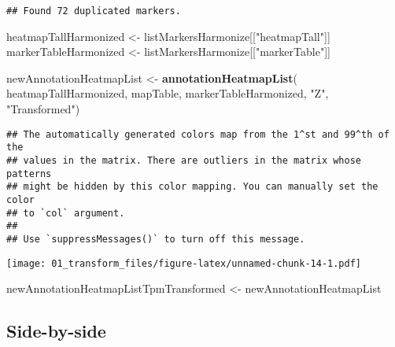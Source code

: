 \documentclass[
]{article}
\newenvironment{Shaded}{\begin{snugshade}}{\end{snugshade}}
\newcommand{\FunctionTok}[1]{\textcolor[rgb]{0.13,0.29,0.53}{\textbf{#1}}}
\newcommand{\NormalTok}[1]{#1}
\newcommand{\OtherTok}[1]{\textcolor[rgb]{0.56,0.35,0.01}{#1}}
\newcommand{\SpecialCharTok}[1]{\textcolor[rgb]{0.81,0.36,0.00}{\textbf{#1}}}
\newcommand{\StringTok}[1]{\textcolor[rgb]{0.31,0.60,0.02}{#1}}
\begin{document}
\begin{verbatim}
## Found 72 duplicated markers.
\end{verbatim}

\begin{Shaded}
\begin{Highlighting}[]
\NormalTok{heatmapTallHarmonized }\OtherTok{\textless{}{-}}\NormalTok{ listMarkersHarmonize[[}\StringTok{"heatmapTall"}\NormalTok{]]}
\NormalTok{markerTableHarmonized }\OtherTok{\textless{}{-}}\NormalTok{ listMarkersHarmonize[[}\StringTok{"markerTable"}\NormalTok{]]}
\end{Highlighting}
\end{Shaded}

\begin{Shaded}
\begin{Highlighting}[]
\NormalTok{newAnnotationHeatmapList }\OtherTok{\textless{}{-}} \FunctionTok{annotationHeatmapList}\NormalTok{(}
\NormalTok{  heatmapTallHarmonized, mapTable, markerTableHarmonized, }\StringTok{"Z"}\NormalTok{, }\StringTok{"Transformed"}\NormalTok{)}
\end{Highlighting}
\end{Shaded}

\begin{verbatim}
## The automatically generated colors map from the 1^st and 99^th of the
## values in the matrix. There are outliers in the matrix whose patterns
## might be hidden by this color mapping. You can manually set the color
## to `col` argument.
## 
## Use `suppressMessages()` to turn off this message.
\end{verbatim}

\begin{Shaded}
\end{Shaded}

\texttt{[image: 01\_transform\_files/figure-latex/unnamed-chunk-14-1.pdf]}

\begin{Shaded}
\begin{Highlighting}[]
\NormalTok{newAnnotationHeatmapListTpmTransformed }\OtherTok{\textless{}{-}}\NormalTok{ newAnnotationHeatmapList}
\end{Highlighting}
\end{Shaded}

\hypertarget{side-by-side}{%
\subsection{Side-by-side}\label{side-by-side}}
\end{document}
